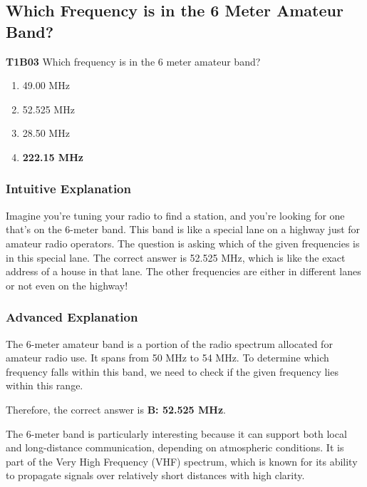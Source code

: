 \subsection{Which Frequency is in the 6 Meter Amateur Band?}

\begin{tcolorbox}[colback=gray!10!white,colframe=black!75!black]
    \textbf{T1B03} Which frequency is in the 6 meter amateur band?
    \begin{enumerate}[label=\Alph*)]
        \item 49.00 MHz
        \item 52.525 MHz
        \item 28.50 MHz
        \item \textbf{222.15 MHz}
    \end{enumerate}
\end{tcolorbox}

\subsubsection{Intuitive Explanation}
Imagine you're tuning your radio to find a station, and you're looking for one that's on the 6-meter band. This band is like a special lane on a highway just for amateur radio operators. The question is asking which of the given frequencies is in this special lane. The correct answer is 52.525 MHz, which is like the exact address of a house in that lane. The other frequencies are either in different lanes or not even on the highway!

\subsubsection{Advanced Explanation}
The 6-meter amateur band is a portion of the radio spectrum allocated for amateur radio use. It spans from 50 MHz to 54 MHz. To determine which frequency falls within this band, we need to check if the given frequency lies within this range.

Therefore, the correct answer is \textbf{B: 52.525 MHz}.

The 6-meter band is particularly interesting because it can support both local and long-distance communication, depending on atmospheric conditions. It is part of the Very High Frequency (VHF) spectrum, which is known for its ability to propagate signals over relatively short distances with high clarity.

